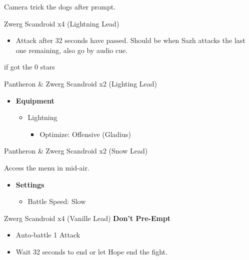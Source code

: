 	Camera trick the dogs after prompt.

	\begin{battle}[0:32]{Zwerg Scandroid x4 (Lightning Lead)}
		\begin{itemize}
			\item Attack after 32 seconds have passed. Should be when Sazh attacks the last one remaining, also go by audio cue.
		\end{itemize}
		 if got the 0 stars
	\end{battle}


	\begin{battle}[0:14]{Pantheron \& Zwerg Scandroid x2 (Lighting Lead)}
	\end{battle}


	\begin{menu}
		\begin{itemize}
			\item \textbf{Equipment}
			      \begin{itemize}
				      \item Lightning
				            \begin{itemize}
					            \item Optimize: Offensive (Gladius)
				            \end{itemize}
			      \end{itemize}
		\end{itemize}
	\end{menu}

	\begin{battle}[0:14]{Pantheron \& Zwerg Scandroid x2 (Snow Lead)}
	\end{battle}
	Access the menu in mid-air.

	\begin{menu}
		\begin{itemize}
			\item \textbf{Settings}
			      \begin{itemize}
				      \item Battle Speed: Slow
			      \end{itemize}
		\end{itemize}
	\end{menu}

	\begin{battle}[0:32]{Zwerg Scandroid x4 (Vanille Lead) \textbf{Don't Pre-Empt}}
		\begin{itemize}
			\item Auto-battle 1 Attack
			\item Wait 32 seconds to end or let Hope end the fight.
		\end{itemize}
	\end{battle}

